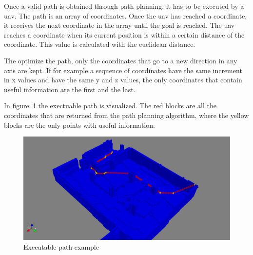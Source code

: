 Once a valid path is obtained through path planning, it has to be executed by a \acs{uav}. The path is an array of coordinates. Once the \acs{uav} has reached a coordinate, it receives the next coordinate in the array until the goal is reached. The \acs{uav} reaches a coordinate when its current position is within a certain distance of the coordinate. This value is calculated with the euclidean distance.

The optimize the path, only the coordinates that go to a new direction in any axis are kept. If for example a sequence of coordinates have the same increment in x values and have the same y and z values, the only coordinates that contain useful information are the first and the last.

In figure~\ref{fig:path} the exectuable path is visualized. The red blocks are all the coordinates that are returned from the path planning algorithm, where the yellow blocks are the only points with useful information.

\begin{figure}[!h]
  \centering
  \includegraphics[width=\linewidth]{images/path.png}
  \caption{Executable path example}
  \label{fig:path}
\end{figure}